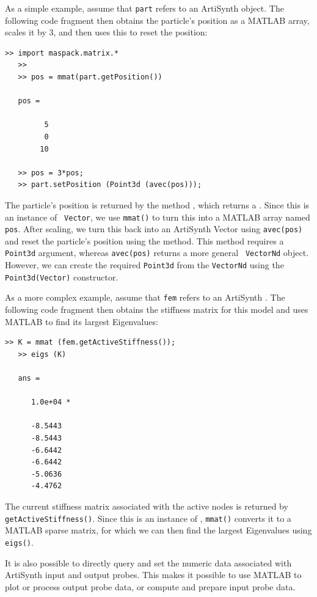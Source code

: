 \documentclass{article}
\begin{document}
As a simple example, assume that {\tt part} refers to an ArtiSynth
object. The following code fragment 
then obtains the particle's position as a MATLAB array,
scales it by 3, and then uses this to reset the position:
%
\begin{lstlisting}[]
   >> import maspack.matrix.*
   >> 
   >> pos = mmat(part.getPosition())

   pos =

         5
         0
        10

   >> pos = 3*pos;
   >> part.setPosition (Point3d (avec(pos)));
\end{lstlisting}
%
The particle's position is returned by the method 
,
which returns a . 
Since this is an instance of {\tt
Vector}, we use {\tt mmat()} to turn this into a MATLAB array named {\tt
pos}.  After scaling, we turn this back into an ArtiSynth Vector using
{\tt avec(pos)} and reset the particle's position using the
method. This method requires a {\tt Point3d}
argument, whereas {\tt avec(pos)} returns a more general {\tt
VectorNd} object. However, we can create the required
{\tt Point3d} from the {\tt VectorNd} using the {\tt Point3d(Vector)}
constructor.

As a more complex example, assume that {\tt fem} refers to an
ArtiSynth . The
following code fragment then obtains the stiffness matrix for this
model and uses MATLAB to find its largest Eigenvalues:
%
\begin{lstlisting}[]
   >> K = mmat (fem.getActiveStiffness());
   >> eigs (K)
   
   ans =
   
      1.0e+04 *
   
      -8.5443
      -8.5443
      -6.6442
      -6.6442
      -5.0636
      -4.4762
\end{lstlisting}
%
The current stiffness matrix associated with the active nodes is
returned by {\tt getActiveStiffness()}. Since this is an instance of
, {\tt mmat()} converts
it to a MATLAB sparse matrix, for which we can then find the largest
Eigenvalues using {\tt eigs()}.

It is also possible to directly query and set the numeric data
associated with ArtiSynth input and output probes. This makes it
possible to use MATLAB to plot or process output probe data, or
compute and prepare input probe data.
\end{document}
